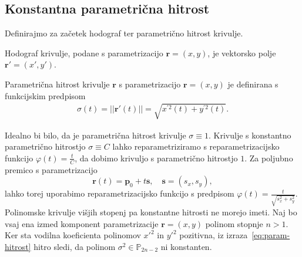 \documentclass[isrm2, tisk]{fmfdelo}
\newcommand{\p}{\mathbf{p}}
\begin{document}
    \subsection{Konstantna parametrična hitrost}\label{sec:konstantna-hitrost}
    Definirajmo za začetek hodograf ter parametrično hitrost krivulje.
    \begin{definicija}
        Hodograf krivulje, podane s parametrizacijo $\mathbf{r}=(x,y)$, je vektorsko polje $\mathbf{r}'=(x',y')$.
    \end{definicija}
    \begin{definicija}
        Parametrična hitrost krivulje $\mathbf{r}$ s parametrizacijo $\mathbf{r}= \left(x,y\right)$ je definirana s funkcijskim predpisom
        \begin{align}
            \sigma(t)= ||\mathbf{r}'(t)|| = \sqrt {x^{'2}(t)+y^{'2}(t)}. \label{eq:param-hitrost}
        \end{align}
    \end{definicija}
    \noindent Idealno bi bilo, da je parametrična hitrost krivulje $\sigma \equiv 1$.
    Krivulje s konstantno parametrično hitrostjo $\sigma\equiv C$ lahko reparametriziramo s reparametrizacijsko funkcijo $\varphi(t)=\frac{t}{C}$, da dobimo krivuljo s parametrično hitrostjo $1$.
    Za poljubno premico s parametrizacijo
    \[\mathbf{r}(t) = \p_0 + t\mathbf{s},\quad  \mathbf{s} = (s_x,s_y),\]
    lahko torej uporabimo reparametrizacijsko funkcijo s predpisom $\varphi(t) = \frac{t}{\sqrt{s_x^2+s_y^2}}$.
    Polinomske krivulje višjih stopenj pa konstantne hitrosti ne morejo imeti.
    Naj bo vsaj ena izmed komponent parametrizacije $\mathbf{r}=(x,y)$ polinom stopnje $n>1$.
    Ker sta vodilna koeficienta polinomov $x'^2$ in $y'^2$ pozitivna, iz izraza~\eqref{eq:param-hitrost} hitro sledi, da polinom $\sigma^2\in\mathbb{P}_{2n-2}$ ni konstanten.
\end{document}

